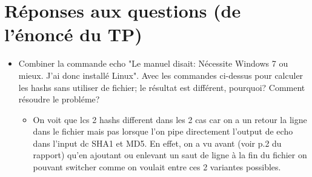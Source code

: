 %
\section{Réponses aux questions (de l'énoncé du TP)}
\begin{frame}{\secname}
%

\begin{itemize}
    \item Combiner la commande echo "Le manuel disait: Nécessite Windows 7 ou mieux. J'ai donc
installé Linux". Avec les commandes ci-dessus pour calculer les hashs sans utiliser de fichier;
le résultat est différent, pourquoi? Comment résoudre le probléme? \\
    \vspace{0.3cm}

    \begin{itemize}
        \item  On voit que lcs 2 hashs different dans les 2 cas car on a un retour la ligne dans le fichier mais pas
        lorsque l'on pipe directement l'output de echo dans l'input dc SHA1 et MD5.
        En effet, on a vu avant (voir p.2 du rapport) qu'en ajoutant ou enlevant un saut de ligne à la fin du fichier  on
        pouvant switcher comme on voulait entre ces 2 variantes possibles.
    \end{itemize}
   
\end{itemize}

\end{frame}
